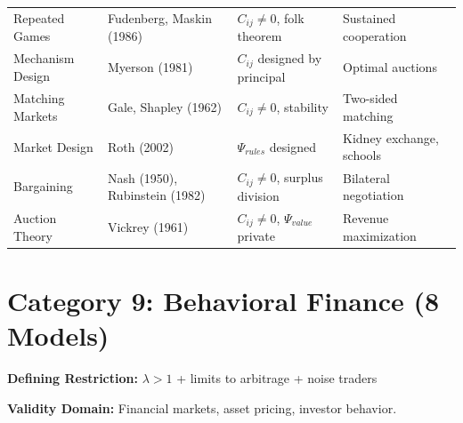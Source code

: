 \begin{longtable}{@{}p{3cm}p{2.5cm}p{4cm}p{4cm}@{}}
Repeated Games & Fudenberg, Maskin (1986) &
$C_{ij} \neq 0$, folk theorem &
Sustained cooperation \\

Mechanism Design & Myerson (1981) &
$C_{ij}$ designed by principal &
Optimal auctions \\

Matching Markets & Gale, Shapley (1962) &
$C_{ij} \neq 0$, stability &
Two-sided matching \\

Market Design & Roth (2002) &
$\Psi_{rules}$ designed &
Kidney exchange, schools \\

Bargaining & Nash (1950), Rubinstein (1982) &
$C_{ij} \neq 0$, surplus division &
Bilateral negotiation \\

Auction Theory & Vickrey (1961) &
$C_{ij} \neq 0$, $\Psi_{value}$ private &
Revenue maximization \\

\bottomrule
\end{longtable}
\normalsize

\section{Category 9: Behavioral Finance (8 Models)}
\label{sec:ms-behfin}

\begin{tcolorbox}[colback=gray!5!white, colframe=gray!75!black,
    title=\textbf{Behavioral Finance: Market Anomalies Extension}]

\textbf{Defining Restriction:} $\lambda > 1$ + limits to arbitrage + noise traders

\textbf{Validity Domain:} Financial markets, asset pricing, investor behavior.

\end{tcolorbox}

